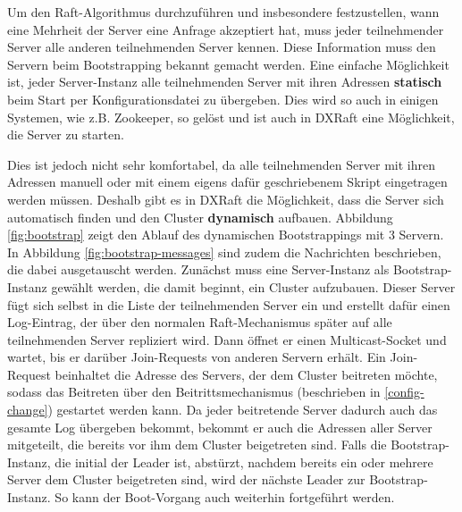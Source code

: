 Um den Raft-Algorithmus durchzuführen und insbesondere festzustellen, wann eine Mehrheit der Server eine Anfrage akzeptiert hat, muss jeder teilnehmender Server alle anderen teilnehmenden Server kennen. Diese Information muss den Servern beim Bootstrapping bekannt gemacht werden. Eine einfache Möglichkeit ist, jeder Server-Instanz alle teilnehmenden Server mit ihren Adressen \textbf{statisch} beim Start per Konfigurationsdatei zu übergeben. Dies wird so auch in einigen Systemen, wie z.B. Zookeeper, so gelöst und ist auch in DXRaft eine Möglichkeit, die Server zu starten. 

Dies ist jedoch nicht sehr komfortabel, da alle teilnehmenden Server mit ihren Adressen manuell oder mit einem eigens dafür geschriebenem Skript eingetragen werden müssen. Deshalb gibt es in DXRaft die Möglichkeit, dass die Server sich automatisch finden und den Cluster \textbf{dynamisch} aufbauen. Abbildung \ref{fig:bootstrap} zeigt den Ablauf des dynamischen Bootstrappings mit 3 Servern. In Abbildung \ref{fig:bootstrap-messages} sind zudem die Nachrichten beschrieben, die dabei ausgetauscht werden. Zunächst muss eine Server-Instanz als Bootstrap-Instanz gewählt werden, die damit beginnt, ein Cluster aufzubauen. Dieser Server fügt sich selbst in die Liste der teilnehmenden Server ein und erstellt dafür einen Log-Eintrag, der über den normalen Raft-Mechanismus später auf alle teilnehmenden Server repliziert wird. Dann öffnet er einen Multicast-Socket und wartet, bis er darüber Join-Requests von anderen Servern erhält. Ein Join-Request beinhaltet die Adresse des Servers, der dem Cluster beitreten möchte, sodass das Beitreten über den Beitrittsmechanismus (beschrieben in \ref{config-change}) gestartet werden kann. Da jeder beitretende Server dadurch auch das gesamte Log übergeben bekommt, bekommt er auch die Adressen aller Server mitgeteilt, die bereits vor ihm dem Cluster beigetreten sind. Falls die Bootstrap-Instanz, die initial der Leader ist, abstürzt, nachdem bereits ein oder mehrere Server dem Cluster beigetreten sind, wird der nächste Leader zur Bootstrap-Instanz. So kann der Boot-Vorgang auch weiterhin fortgeführt werden.

